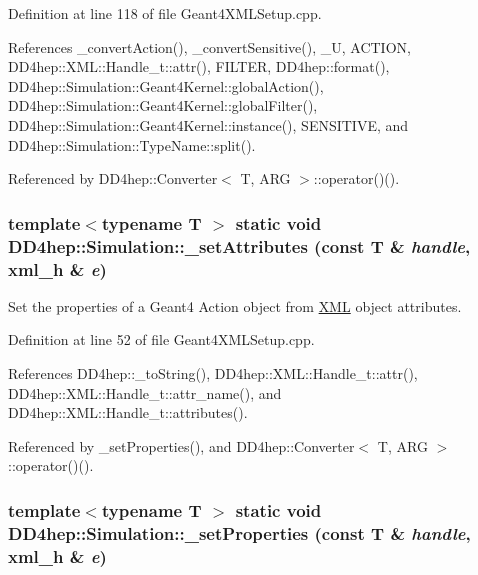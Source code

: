 Definition at line 118 of file Geant4XMLSetup.cpp.

References \_\-convertAction(), \_\-convertSensitive(), \_\-U, ACTION, DD4hep::XML::Handle\_\-t::attr(), FILTER, DD4hep::format(), DD4hep::Simulation::Geant4Kernel::globalAction(), DD4hep::Simulation::Geant4Kernel::globalFilter(), DD4hep::Simulation::Geant4Kernel::instance(), SENSITIVE, and DD4hep::Simulation::TypeName::split().

Referenced by DD4hep::Converter$<$ T, ARG $>$::operator()().\hypertarget{namespace_d_d4hep_1_1_simulation_a4648602c0b9b77f5aae1a35a5c086e39}{
\subsubsection[{\_\-setAttributes}]{\setlength{\rightskip}{0pt plus 5cm}template$<$typename T $>$ static void DD4hep::Simulation::\_\-setAttributes (const {\bf T} \& {\em handle}, \/  {\bf xml\_\-h} \& {\em e})}}
\label{namespace_d_d4hep_1_1_simulation_a4648602c0b9b77f5aae1a35a5c086e39}


Set the properties of a Geant4 Action object from \hyperlink{namespace_d_d4hep_1_1_x_m_l}{XML} object attributes. 

Definition at line 52 of file Geant4XMLSetup.cpp.

References DD4hep::\_\-toString(), DD4hep::XML::Handle\_\-t::attr(), DD4hep::XML::Handle\_\-t::attr\_\-name(), and DD4hep::XML::Handle\_\-t::attributes().

Referenced by \_\-setProperties(), and DD4hep::Converter$<$ T, ARG $>$::operator()().\hypertarget{namespace_d_d4hep_1_1_simulation_acd230c573ec36269957f6c861ac27b50}{
\subsubsection[{\_\-setProperties}]{\setlength{\rightskip}{0pt plus 5cm}template$<$typename T $>$ static void DD4hep::Simulation::\_\-setProperties (const {\bf T} \& {\em handle}, \/  {\bf xml\_\-h} \& {\em e})}}
\label{namespace_d_d4hep_1_1_simulation_acd230c573ec36269957f6c861ac27b50}


